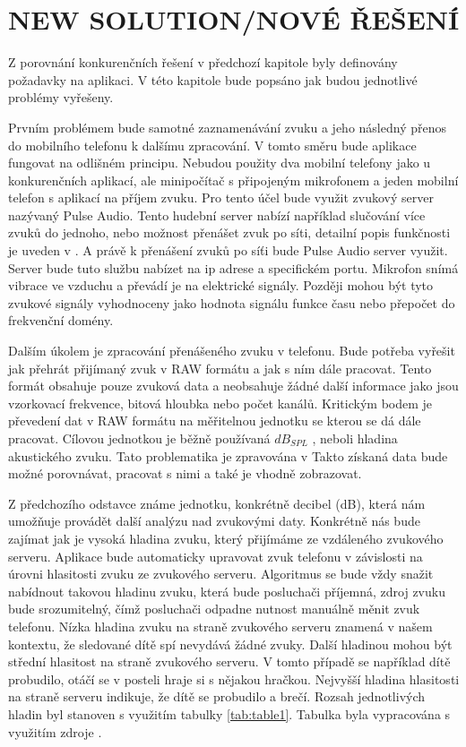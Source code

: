 \documentclass[journal, a4paper]{IEEEtran}
\begin{document}
\section{NEW SOLUTION/NOVÉ ŘEŠENÍ}
Z porovnání konkurenčních řešení v předchozí kapitole byly definovány požadavky na aplikaci. V této kapitole bude popsáno jak budou jednotlivé problémy vyřešeny. \par
Prvním problémem bude samotné zaznamenávání zvuku a jeho následný přenos do mobilního telefonu k dalšímu zpracování. V tomto směru bude aplikace fungovat na odlišném principu. Nebudou použity dva mobilní telefony jako u konkurenčních aplikací, ale minipočítač s připojeným mikrofonem a jeden mobilní telefon s aplikací na příjem zvuku. Pro tento účel bude využit zvukový server nazývaný Pulse Audio. Tento hudební server nabízí například slučování více zvuků do jednoho, nebo možnost přenášet zvuk po síti, detailní popis funkčnosti je uveden v \cite{pulseaudio}. A právě k přenášení zvuků po síťi bude Pulse Audio server využit. Server bude tuto službu nabízet na ip adrese a specifickém portu. Mikrofon snímá vibrace ve vzduchu a převádí je na elektrické signály. Později mohou být tyto zvukové signály vyhodnoceny jako hodnota signálu funkce času nebo přepočet do frekvenční domény. \par
    Dalším úkolem je zpracování přenášeného zvuku v telefonu. Bude potřeba vyřešit jak přehrát přijímaný zvuk v RAW formátu a jak s ním dále pracovat. Tento formát obsahuje pouze zvuková data a neobsahuje žádné další informace jako jsou vzorkovací frekvence, bitová hloubka nebo počet kanálů. Kritickým bodem je převedení dat v RAW formátu na měřitelnou jednotku se kterou se dá dále pracovat. Cílovou jednotkou je běžně používaná $dB_{SPL}$ , neboli hladina akustického zvuku. Tato problematika je zpravována v  \cite{dbspl} Takto získaná data bude možné porovnávat, pracovat s nimi a také je vhodně zobrazovat. \par
    Z předchozího odstavce známe jednotku, konkrétně decibel (dB), která nám umožňuje provádět další analýzu nad zvukovými daty. Konkrétně nás bude zajímat jak je vysoká hladina zvuku, který přijímáme ze vzdáleného zvukového serveru. Aplikace bude automaticky upravovat zvuk telefonu v závislosti na úrovni hlasitosti zvuku ze zvukového serveru. Algoritmus se bude vždy snažit nabídnout takovou hladinu zvuku, která bude posluchači příjemná, zdroj zvuku bude srozumitelný, čímž posluchači odpadne nutnost manuálně měnit zvuk telefonu. Nízka hladina zvuku na straně zvukového serveru znamená v našem kontextu, že sledované dítě spí nevydává žádné zvuky. Další hladinou mohou být střední hlasitost na straně zvukového serveru. V tomto případě se například dítě probudilo, otáčí se v posteli hraje si s nějakou hračkou. Nejvyšší hladina hlasitosti na straně serveru indikuje, že dítě se probudilo a brečí. Rozsah jednotlivých hladin byl stanoven s využitím tabulky \ref{tab:table1}. Tabulka byla vypracována s využitím zdroje \cite{tableres}. 
\end{document}
